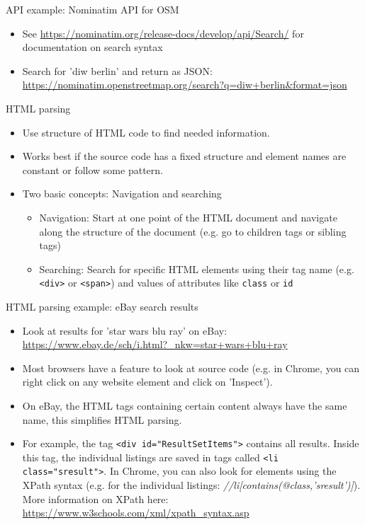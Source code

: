 \begin{frame}{API example: Nominatim API for OSM}
\begin{itemize}
	\item See \url{https://nominatim.org/release-docs/develop/api/Search/} for documentation on search syntax
	\item Search for 'diw berlin' and return as JSON: \url{https://nominatim.openstreetmap.org/search?q=diw+berlin&format=json}
\end{itemize}

\end{frame}

\begin{frame}{HTML parsing}
\begin{itemize}
	\item Use structure of HTML code to find needed information.
	\item Works best if the source code has a fixed structure and element names are constant or follow some pattern.
	\item Two basic concepts: Navigation and searching
	\begin{itemize}
		\item Navigation: Start at one point of the HTML document and navigate along the structure of the document (e.g. go to children tags or sibling tags)
		\item Searching: Search for specific HTML elements using their tag name (e.g. \texttt{<div>} or \texttt{<span>}) and values of attributes like \texttt{class} or \texttt{id}
	\end{itemize}
\end{itemize}
\end{frame}

\begin{frame}{HTML parsing example: eBay search results}
\begin{itemize}
	\item Look at results for 'star wars blu ray' on eBay: \url{https://www.ebay.de/sch/i.html?_nkw=star+wars+blu+ray}
	\item Most browsers have a feature to look at source code (e.g. in Chrome, you can right click on any website element and click on 'Inspect').
	\item On eBay, the HTML tags containing certain content always have the same name, this simplifies HTML parsing.
	\item For example, the tag \texttt{<div id="ResultSetItems">} contains all results. Inside this tag, the individual listings are saved in tags called \texttt{<li class="sresult">}. In Chrome, you can also look for elements using the XPath syntax (e.g. for the individual listings: \textit{//li[contains(@class,'sresult')]}). More information on XPath here: \url{https://www.w3schools.com/xml/xpath_syntax.asp}
\end{itemize}
\end{frame}

